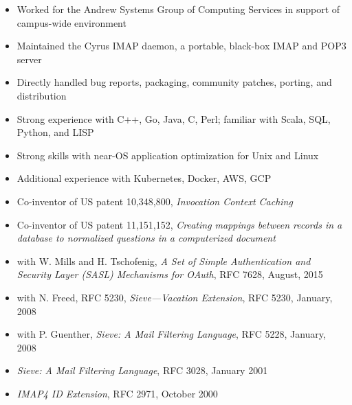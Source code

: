\documentclass[letterpaper,11pt,twoside]{article}
\begin{document}
\vspace{-14pt}
\begin{itemize}
\item Worked for the Andrew Systems Group of Computing Services in
  support of campus-wide environment
\item Maintained the Cyrus IMAP daemon, a portable, black-box IMAP and
  POP3 server
\item Directly handled bug reports, packaging, community patches,
  porting, and distribution
\end{itemize}

\pagebreak

\vspace{2pt}

\vspace{-6pt}
\begin{itemize}
\item Strong experience with C++, Go, Java, C, Perl; familiar with
  Scala, SQL, Python, and LISP
\item Strong skills with near-OS application optimization for Unix and Linux
\item Additional experience with Kubernetes, Docker, AWS, GCP
\end{itemize}

\vspace{-6pt}
\begin{itemize}
\item Co-inventor of US patent 10,348,800, {\sl Invocation Context Caching}
\item Co-inventor of US patent 11,151,152, {\sl Creating mappings between
    records in a database to normalized questions in a computerized document}
\item with W. Mills and H. Tschofenig, {\sl A Set of Simple Authentication and
  Security Layer (SASL) Mechanisms for OAuth}, RFC 7628, August, 2015
\item with N. Freed, RFC 5230, {\sl Sieve---Vacation Extension}, RFC
  5230, January, 2008
\item with P. Guenther, {\sl Sieve: A Mail Filtering Language}, RFC
  5228, January, 2008
\item {\sl Sieve: A Mail Filtering Language}, RFC 3028, January 2001
\item {\sl IMAP4 ID Extension}, RFC 2971, October 2000
\end{itemize}
\end{document}
